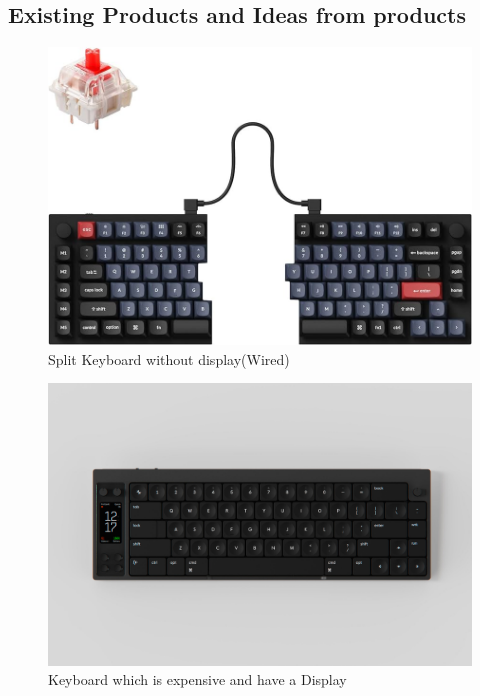 \documentclass[a4paper,11pt]{article}%
\begin{document}
\subsection{Existing Products and Ideas from products}

\begin{figure}[H]
    \centering
    \includegraphics[scale=0.53]{figures/split_keyboard.jpg}
    \caption{Split Keyboard without display(Wired)}
\end{figure}
\vspace{0.2cm}
\begin{figure}[H]
    \centering
    \includegraphics[scale=0.26]{figures/nomad.jpg}
    \caption{Keyboard which is expensive and have a Display}
\end{figure}
\vspace{0.2cm}
\end{document}

